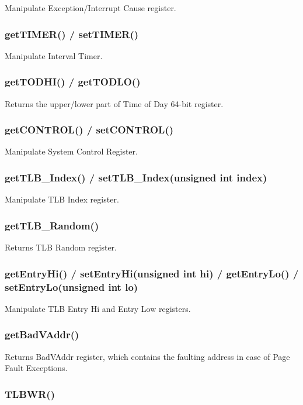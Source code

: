 Manipulate Exception/Interrupt Cause register.

\subsubsection{getTIMER() / setTIMER()}

Manipulate Interval Timer.

\subsubsection{getTODHI() / getTODLO()}

Returns the upper/lower part of Time of Day 64-bit register.

\subsubsection{getCONTROL() / setCONTROL()}

Manipulate System Control Register.

\subsubsection{getTLB\_Index() / setTLB\_Index(unsigned int index)}

Manipulate TLB Index register.

\subsubsection{getTLB\_Random()}

Returns TLB Random register.

\subsubsection{getEntryHi() / setEntryHi(unsigned int hi) / getEntryLo() / setEntryLo(unsigned int lo)}

Manipulate TLB Entry Hi and Entry Low registers.

\subsubsection{getBadVAddr()}

Returns BadVAddr register, which contains the faulting address in case of Page Fault Exceptions.

\subsubsection{TLBWR()}

